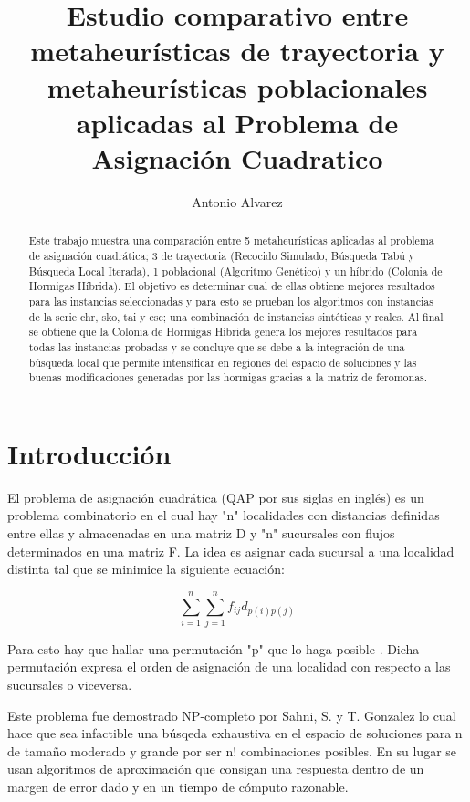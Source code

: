 \documentclass{ci5652}
\title{Estudio comparativo entre metaheurísticas de trayectoria y metaheurísticas poblacionales aplicadas al Problema de Asignación Cuadratico}
\author{Antonio Alvarez}
\begin{document}
\thispagestyle{empty}
\maketitle

\begin{abstract}
Este trabajo muestra una comparación entre 5 metaheurísticas aplicadas al problema de asignación cuadrática; 3 de trayectoria (Recocido Simulado, Búsqueda Tabú y Búsqueda Local Iterada), 1 poblacional (Algoritmo Genético) y un híbrido (Colonia de Hormigas Híbrida). El objetivo es determinar cual de ellas obtiene mejores resultados para las instancias seleccionadas y para esto se prueban los algoritmos con instancias de la serie chr, sko, tai y esc; una combinación de instancias sintéticas y reales. Al final se obtiene que la Colonia de Hormigas Híbrida genera los mejores resultados para todas las instancias probadas y se concluye que se debe a la integración de una búsqueda local que permite intensificar en regiones del espacio de soluciones y las buenas modificaciones generadas por las hormigas gracias a la matriz de feromonas. 
\end{abstract}

\section{Introducción}

El problema de asignación cuadrática (QAP por sus siglas en inglés) es un problema combinatorio en el cual hay "n" localidades con distancias definidas entre ellas y almacenadas en una matriz D y "n" sucursales con flujos determinados en una matriz F. La idea es asignar cada sucursal a una localidad distinta tal que se minimice la siguiente ecuación: 

\begin {equation*}
\sum_{i=1}^{n} \sum_{j=1}^{n} f_{ij} d_{p(i)p(j)}
\end {equation*}

Para esto hay que hallar una permutación "p"  que lo haga posible \cite{1}. Dicha permutación expresa el orden de asignación de una localidad con respecto a las sucursales o viceversa.

Este problema fue demostrado NP-completo por Sahni, S. y T. Gonzalez \cite{2} lo cual hace que sea infactible una búsqeda exhaustiva en el espacio de soluciones para n de tamaño moderado y grande por ser n! combinaciones posibles. En su lugar se usan algoritmos de aproximación que consigan una respuesta dentro de un margen de error dado y en un tiempo de cómputo razonable.
\end{document}
